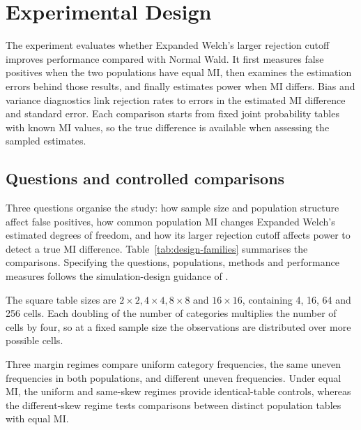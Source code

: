 \chapter{Experimental Design}
\label{chap:design}

The experiment evaluates whether Expanded Welch's larger rejection cutoff
improves performance compared with Normal Wald. It first measures false
positives when the two populations have equal MI, then examines the
estimation errors behind those results,
and finally estimates power when MI differs. Bias and variance diagnostics
link rejection rates to errors in the estimated MI difference and standard
error. Each comparison starts from fixed joint probability tables with
known MI values, so the
true difference is available when assessing the sampled estimates.

\section{Questions and controlled comparisons}

Three questions organise the study: how sample size and population structure
affect false positives, how common population MI changes Expanded Welch's
estimated degrees of freedom, and how its larger rejection cutoff affects
power to detect a true MI difference. Table~\ref{tab:design-families}
summarises the comparisons. Specifying the questions, populations,
methods and performance measures follows the simulation-design guidance of
\citet{morris2019}.

The square table sizes are \(2\times2,4\times4,8\times8\) and
\(16\times16\), containing 4, 16, 64 and 256 cells. Each doubling of
the number of categories multiplies the number of cells by four, so at a
fixed sample size the observations are distributed over more
possible cells.

Three margin regimes compare uniform category frequencies, the same
uneven frequencies in both populations, and different uneven frequencies.
Under equal MI, the uniform and same-skew regimes provide identical-table
controls, whereas the different-skew regime tests comparisons between distinct
population tables with equal MI.

